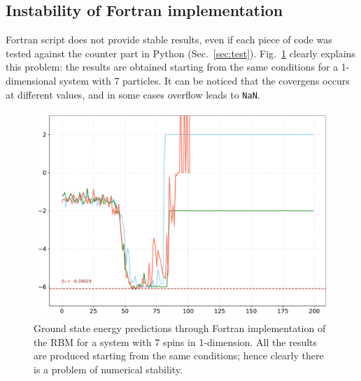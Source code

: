 \documentclass[a4paper,11pt]{article}
\begin{document}


{\footnotesize

}


\clearpage

\begin{appendices}
\section{Instability of Fortran implementation}
\label{appendix:fortran}

Fortran script does not provide stable results, even if each piece of code was tested against the counter part in Python (Sec.~\ref{sec:test}). Fig.~\ref{fig:fortran} clearly explains this problem: the results are obtained starting from the same conditions for a 1-dimensional system with 7 particles. It can be noticed that the covergens occurs at different values, and in some cases overflow leads to \texttt{NaN}.

\begin{figure}[htb]
    \centering
    \caption{Ground state energy predictions through Fortran implementation of the RBM for a system with 7 spins in 1-dimension. All the results are produced starting from the same conditions; hence clearly there is a problem of numerical stability.}
    \label{fig:fortran}
    \includegraphics[width=.85\linewidth]{figure/fortran.pdf}
\end{figure}


\end{appendices}
\end{document}
